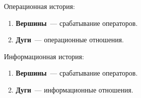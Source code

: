Операционная история:
\begin{enumerate}
    \item \textbf{Вершины}~--- срабатывание операторов.
    \item \textbf{Дуги}~--- операционные отношения.
\end{enumerate}

Информационная история:
\begin{enumerate}
    \item \textbf{Вершины}~--- срабатывание операторов.
    \item \textbf{Дуги}~--- информационные отношения.
\end{enumerate}

